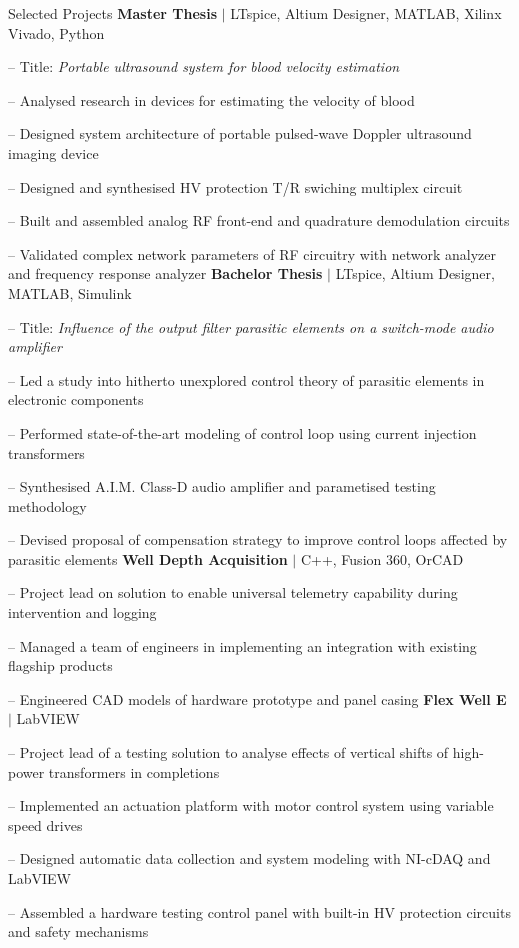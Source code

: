 
\begin{rubric}{\faTasks[solid]  Selected Projects}
\entry*[2023][]%
	\textbf{Master Thesis} $|$ LTspice, Altium Designer, MATLAB, Xilinx Vivado, Python \par
	-- Title: \emph{Portable ultrasound system for blood velocity estimation} \par
	-- Analysed research in devices for estimating the velocity of blood \par
	-- Designed system architecture of portable pulsed-wave Doppler ultrasound imaging device \par
	-- Designed and synthesised HV protection T/R swiching multiplex circuit \par
	-- Built and assembled analog RF front-end and quadrature demodulation circuits \par
	-- Validated complex network parameters of RF circuitry with network analyzer and frequency response analyzer
%
\entry*[2020][] \textbf{Bachelor Thesis} $|$ LTspice, Altium Designer, MATLAB, Simulink \par
	-- Title: \emph{Influence of the output filter parasitic elements on a switch-mode audio amplifier} \par
	-- Led a study into hitherto unexplored control theory of parasitic elements in electronic components \par
	-- Performed state-of-the-art modeling of control loop using current injection transformers \par
	-- Synthesised A.I.M. Class-D audio amplifier and parametised testing methodology \par
	-- Devised proposal of compensation strategy to improve control loops affected by parasitic elements
%
\entry*[2017][] \textbf{Well Depth Acquisition} $|$ C++, Fusion 360, OrCAD \par
	-- Project lead on solution to enable universal telemetry capability during intervention and logging \par
	-- Managed a team of engineers in implementing an integration with existing flagship products \par
	-- Engineered CAD models of hardware prototype and panel casing %
%
\entry*[2016][] \textbf{Flex Well E} $|$ LabVIEW \par
	-- Project lead of a testing solution to analyse effects of vertical shifts of high-power transformers in completions \par
	-- Implemented an actuation platform with motor control system using variable speed drives \par
	-- Designed automatic data collection and system modeling with NI-cDAQ and LabVIEW \par
	-- Assembled a hardware testing control panel with built-in HV protection circuits and safety mechanisms
\end{rubric}